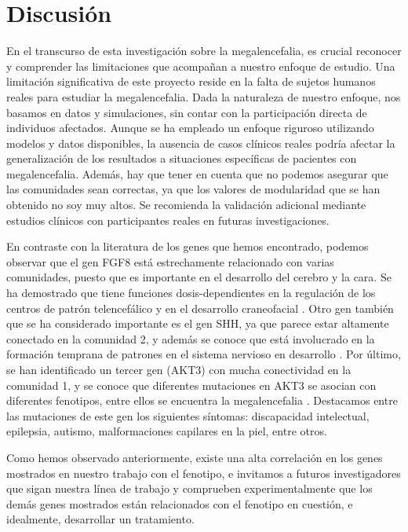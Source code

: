 \section{Discusión}

En el transcurso de esta investigación sobre la megalencefalia, es crucial reconocer y comprender las limitaciones que acompañan a nuestro enfoque de estudio. Una limitación significativa de este proyecto reside en la falta de sujetos humanos reales para estudiar la megalencefalia. Dada la naturaleza de nuestro enfoque, nos basamos en datos y simulaciones, sin contar con la participación directa de individuos afectados. Aunque se ha empleado un enfoque riguroso utilizando modelos y datos disponibles, la ausencia de casos clínicos reales podría afectar la generalización de los resultados a situaciones específicas de pacientes con megalencefalia. Además, hay que tener en cuenta que no podemos asegurar que las comunidades sean correctas, ya que los valores de modularidad que se han obtenido no soy muy altos. Se recomienda la validación adicional mediante estudios clínicos con participantes reales en futuras investigaciones. 





En contraste con la literatura de los genes que hemos encontrado, podemos observar que el gen FGF8 está estrechamente relacionado con varias comunidades, puesto que es importante en el desarrollo del cerebro y la cara. Se ha demostrado que tiene funciones dosis-dependientes en la regulación de los centros de patrón telencefálico y en el desarrollo craneofacial \cite{fgf8}. Otro gen también que se ha considerado importante es el gen SHH, ya que parece estar altamente conectado en la comunidad 2, y además se conoce que está involucrado en la formación temprana de patrones en el sistema nervioso en desarrollo \cite{winden_megalencephaly_2015}. Por último, se han identificado un tercer gen (AKT3) con mucha conectividad en la comunidad 1, y se conoce que diferentes mutaciones en AKT3 se asocian con diferentes fenotipos, entre ellos se encuentra la megalencefalia \cite{akt3}. Destacamos entre las mutaciones de este gen los siguientes síntomas: discapacidad intelectual, epilepsia, autismo, malformaciones capilares en la piel, entre otros.

Como hemos observado anteriormente, existe una alta correlación en los genes mostrados en nuestro trabajo con el fenotipo, e invitamos a futuros investigadores que sigan nuestra línea de trabajo y comprueben experimentalmente que los demás genes mostrados están relacionados con el fenotipo en cuestión, e idealmente, desarrollar un tratamiento.
